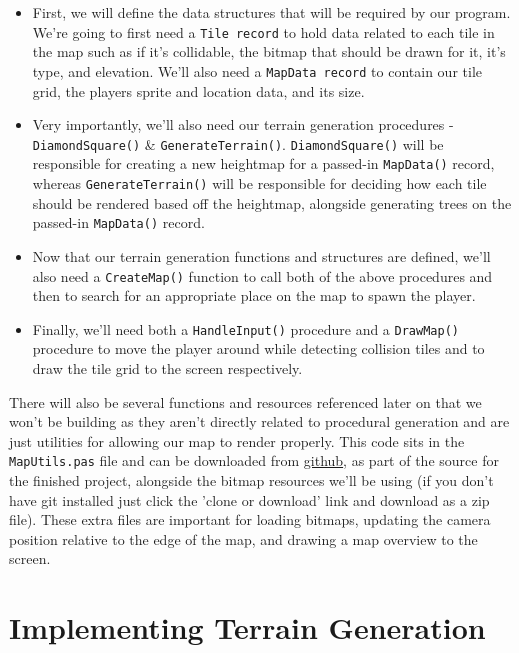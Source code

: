 \documentclass{article}
\begin{document}
\begin{itemize}

\item
	First, we will define the data structures that will be required by our program. We're going to first need a \texttt{Tile record} to hold data related to each tile in the map such as if it's collidable, the bitmap that should be drawn for it, it's type, and elevation. We'll also need a \texttt{MapData record} to contain our tile grid, the players sprite and location data, and its size.
\item
	Very importantly, we'll also need our terrain generation procedures - \texttt{DiamondSquare()} \& \texttt{GenerateTerrain()}. \texttt{DiamondSquare()} will be responsible for creating a new heightmap for a passed-in \texttt{MapData()} record, whereas \texttt{GenerateTerrain()} will be responsible for deciding how each tile should be rendered based off the heightmap, alongside generating trees on the passed-in \texttt{MapData()} record.
\item
	Now that our terrain generation functions and structures are defined, we'll also need a \texttt{CreateMap()} function to call both of the above procedures and then to search for an appropriate place on the map to spawn the player.
\item
	Finally, we'll need both a \texttt{HandleInput()} procedure and a \texttt{DrawMap()} procedure to move the player around while detecting collision tiles and to draw the tile grid to the screen respectively.
	
\end{itemize}

There will also be several functions and resources referenced later on that we won't be building as they aren't directly related to procedural generation and are just utilities for allowing our map to render properly. This code sits in the \texttt{MapUtils.pas} file and can be downloaded from \href{https://github.com/jacobmilligan/intro_hd_report}{github}, as part of the source for the finished project, alongside the bitmap resources we'll be using (if you don't have git installed just click the 'clone or download' link and download as a zip file). These extra files are important for loading bitmaps, updating the camera position relative to the edge of the map, and drawing a map overview to the screen.


\section{Implementing Terrain Generation}
\end{document}

